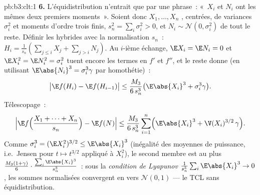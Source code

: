 \begin{solution}{pb:b3:clt:1}
\textbf{6.} L'équidistribution n'entrait que par une phrase~:
«~$X_i$ et $N_i$ ont les mêmes deux premiers moments~».
Soient donc $X_1, \dots, X_n$ , centrées, de
variances $\sigma_i^2$ et moments d'ordre trois finis, $s_n^2
= \sum_i\sigma_i^2 > 0$, et $N_i \sim \mathcal N(0,
\sigma_i^2)$  de tout le reste. Définir les
hybrides avec la normalisation $s_n$~: $H_i =
\frac1{s_n}(\sum_{j\leq i}X_j + \sum_{j>i}N_j)$. Au $i$-ième
échange, $\E X_i = \E N_i = 0$ et $\E X_i^2 = \E N_i^2 =
\sigma_i^2$ tuent encore les termes en $f'$ et $f''$, et le
reste donne (en utilisant $\E\abs{N_i}^3 = \sigma_i^3\gamma$
par homothétie)~:
\[
\bigl|\E f(H_i) - \E f(H_{i-1})\bigr| \leq
\frac{M_3}{6\,s_n^3}\bigl(\E\abs{X_i}^3 +
\sigma_i^3\gamma\bigr) .
\]
Télescopage~:
\[
\Bigl|\E f\Bigl(\frac{X_1 + \dots + X_n}{s_n}\Bigr) -
\E f(N)\Bigr| \leq \frac{M_3}{6\,s_n^3}\sum_{i=1}^n
\Bigl(\E\abs{X_i}^3 + \V(X_i)^{3/2}\,\gamma\Bigr) .
\]
Comme $\sigma_i^3 = (\E X_i^2)^{3/2} \leq \E\abs{X_i}^3$
(inégalité des moyennes de puissance, i.e.\ Jensen pour $t
\mapsto t^{3/2}$ appliqué à $X_i^2$), le second membre est
au plus $\frac{M_3(1 + \gamma)}{6}\cdot
\frac{\sum_i\E\abs{X_i}^3}{s_n^3}$~: sous la
\emph{condition de Lyapunov} $\frac1{s_n^3}\sum_i\E\abs{X_i}^3
\to 0$, les sommes normalisées convergent en  vers
$\mathcal N(0,1)$ --- le TCL sans équidistribution.


\end{solution}
